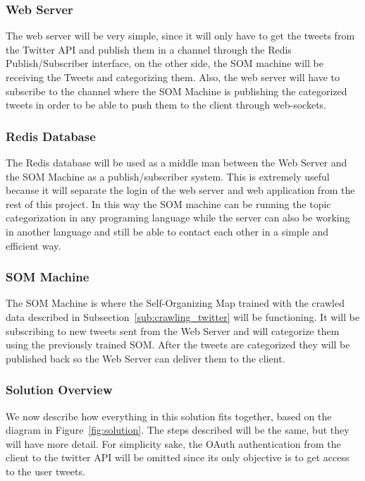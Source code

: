 \subsubsection{Web Server} %
\label{ssub:web_server}
The web server will be very simple, since it will only have to get the tweets from the Twitter API and publish them in a channel through the Redis Publish/Subscriber interface, on the other side, the SOM machine will be receiving the Tweets and categorizing them. Also, the web server will have to subscribe to the channel where the SOM Machine is publishing the categorized tweets in order to be able to push them to the client through web-sockets.

\subsubsection{Redis Database} %
\label{ssub:redis_database}
The Redis database will be used as a middle man between the Web Server and the SOM Machine as a publish/subscriber system. This is extremely useful because it will separate the login of the web server and web application from the rest of this project. In this way the SOM machine can be running the topic categorization in any programing language while the server can also be working in another language and still be able to contact each other in a simple and efficient way.

\subsubsection{SOM Machine} %
\label{ssub:som_machine}
The SOM Machine is where the Self-Organizing Map trained with the crawled data described in Subsection~\ref{sub:crawling_twitter} will be functioning. It will be subscribing to new tweets sent from the Web Server and will categorize them using the previously trained SOM. After the tweets are categorized they will be published back so the Web Server can deliver them to the client.

\subsubsection{Solution Overview} %
\label{ssub:solution_overview}
We now describe how everything in this solution fits together, based on the diagram in Figure~\ref{fig:solution}. The steps described will be the same, but they will have more detail. For simplicity sake, the OAuth authentication from the client to the twitter API will be omitted since its only objective is to get access to the user tweets.

